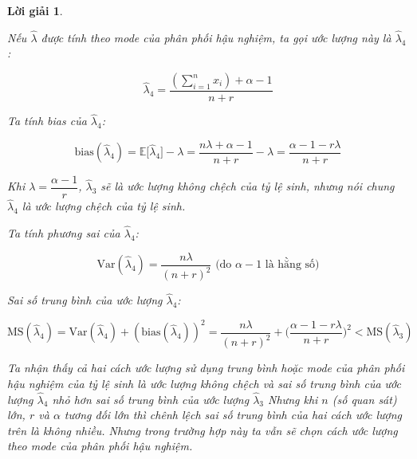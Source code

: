 \documentclass[14pt, a4paper]{article}
\theoremstyle{sltheorem}
\theoremstyle{soltheorem}
\newtheorem*{loigiai}{Lời giải}
\begin{document}
\begin{loigiai}
\begin{enumerate}
\begin{itemize}
            Nếu $\hat{\lambda}$ được tính theo mode của phân phối hậu nghiệm,
            ta gọi ước lượng này là $\hat{\lambda}_4$:

            \begin{equation*}
                \hat{\lambda}_4 = \dfrac{(\sum_{i=1}^n x_i) + \alpha - 1}{n + r}
            \end{equation*}

            Ta tính bias của $\hat{\lambda}_4$:

            \begin{equation*}
                \text{bias}(\hat{\lambda}_4) = \mathbb{E} \lbrack \hat{\lambda}_4 \rbrack - \lambda = \dfrac{n\lambda + \alpha - 1}{n + r} - \lambda = \dfrac{\alpha - 1 - r\lambda}{n + r}
            \end{equation*}

            Khi $\lambda = \dfrac{\alpha - 1}{r}$, $\hat{\lambda}_3$ sẽ là ước lượng không chệch của tỷ lệ sinh, nhưng nói chung $\hat{\lambda}_4$ là ước lượng chệch của tỷ lệ sinh.

            Ta tính phương sai của $\hat{\lambda}_4$:

            \begin{equation*}
                \text{Var}(\hat{\lambda}_4) = \dfrac{n\lambda}{(n+r)^2} \text{ (do } \alpha - 1 \text{ là hằng số)}
            \end{equation*}

            Sai số trung bình của ước lượng $\hat{\lambda}_4$:

            \begin{equation*}
                \text{MS}(\hat{\lambda}_4) = \text{Var}(\hat{\lambda}_4) + (\text{bias}(\hat{\lambda}_4))^2 = \dfrac{n\lambda}{(n+r)^2} + \Big( \dfrac{\alpha - 1 - r\lambda}{n + r} \Big)^2 < \text{MS}(\hat{\lambda}_3)
            \end{equation*}

            Ta nhận thấy cả hai cách ước lượng sử dụng trung bình hoặc mode của phân phối hậu nghiệm của tỷ lệ sinh là ước lượng không chệch và sai số trung bình của ước lượng $\hat{\lambda}_4$ nhỏ hơn sai số trung bình của ước lượng $\hat{\lambda}_3$
            Nhưng khi $n$ (số quan sát) lớn, $r$ và $\alpha$ tương đối lớn thì chênh lệch sai số trung bình của hai cách ước lượng trên là không nhiều.
            Nhưng trong trường hợp này ta vẫn sẽ chọn cách ước lượng theo mode của phân phối hậu nghiệm.

        \end{itemize}


\end{enumerate}
\end{loigiai}
\end{document}
